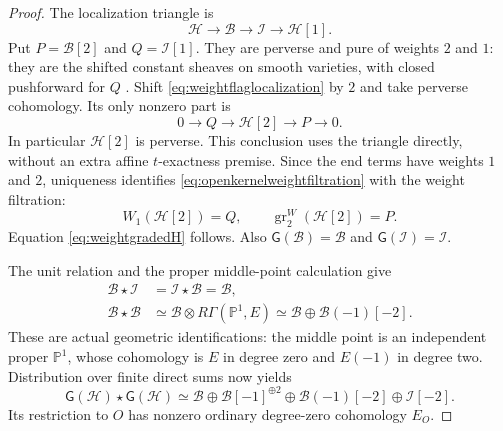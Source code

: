 \begin{proof}
The localization triangle is
\begin{equation}\label{eq:weightflaglocalization}
 \mathcal H\longrightarrow\mathcal B
       \longrightarrow\mathcal I\longrightarrow\mathcal H[1].
\end{equation}
Put \(P=\mathcal B[2]\) and \(Q=\mathcal I[1]\).
They are perverse and pure of weights \(2\) and \(1\):
they are the shifted constant sheaves on smooth varieties,
with closed pushforward for \(Q\)
\cite[\S4.0, p.~102; 5.1.8, pp.~126--127]{BBD}.
Shift \eqref{eq:weightflaglocalization} by \(2\) and take
perverse cohomology. Its only nonzero part is
\begin{equation}\label{eq:openkernelweightfiltration}
 0\longrightarrow Q\longrightarrow\mathcal H[2]
     \longrightarrow P\longrightarrow0.
\end{equation}
In particular \(\mathcal H[2]\) is perverse. This conclusion
uses the triangle directly, without an extra affine
\(t\)-exactness premise. Since the end terms have weights
\(1\) and \(2\), uniqueness identifies
\eqref{eq:openkernelweightfiltration} with the weight
filtration:
\[
 W_1(\mathcal H[2])=Q,\qquad
 \operatorname{gr}^W_2(\mathcal H[2])=P.
\]
Equation \eqref{eq:weightgradedH} follows. Also
\(\mathsf G(\mathcal B)=\mathcal B\) and
\(\mathsf G(\mathcal I)=\mathcal I\).

The unit relation and the proper middle-point calculation give
\begin{equation}\label{eq:closedflagkernelrelation}
 \begin{split}
 \mathcal B\star\mathcal I
   &=\mathcal I\star\mathcal B=\mathcal B,\\
 \mathcal B\star\mathcal B
   &\simeq\mathcal B\otimes R\Gamma(\mathbb P^1,E)
     \simeq\mathcal B\oplus\mathcal B(-1)[-2].
 \end{split}
\end{equation}
These are actual geometric identifications: the middle point
is an independent proper \(\mathbb P^1\), whose cohomology is
\(E\) in degree zero and \(E(-1)\) in degree two.
Distribution over finite direct sums now yields
\begin{equation}\label{eq:productofweightgradedH}
 \mathsf G(\mathcal H)\star\mathsf G(\mathcal H)
  \simeq
   \mathcal B\oplus\mathcal B[-1]^{\oplus2}
      \oplus\mathcal B(-1)[-2]\oplus\mathcal I[-2].
\end{equation}
Its restriction to \(O\) has nonzero ordinary degree-zero
cohomology \(E_O\).


\end{proof}
